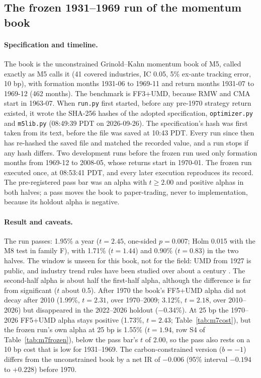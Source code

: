 \subsection{The frozen 1931--1969 run of the momentum book}
\label{app:m7frozen}
\paragraph{Specification and timeline.} The book is the unconstrained Grinold--Kahn momentum book of M5, called exactly as M5 calls it (41 covered industries, IC 0.05, 5\% ex-ante tracking error, 10 bp), with formation months 1931-06 to 1969-11 and return months 1931-07 to 1969-12 (462 months). The benchmark is FF3+UMD, because RMW and CMA start in 1963-07. When \texttt{run.py} first started, before any pre-1970 strategy return existed, it wrote the SHA-256 hashes of the adopted specification, \texttt{optimizer.py} and \texttt{m5lib.py} (08:49:39 PDT on 2026-09-26). The specification's hash was first taken from its text, before the file was saved at 10:43 PDT. Every run since then has re-hashed the saved file and matched the recorded value, and a run stops if any hash differs. Two development runs before the frozen run used only formation months from 1969-12 to 2008-05, whose returns start in 1970-01. The frozen run executed once, at 08:53:41 PDT, and every later execution reproduces its record. The pre-registered pass bar was an alpha with $t\ge2.00$ and positive alphas in both halves; a pass moves the book to paper-trading, never to implementation, because its holdout alpha is negative.

\paragraph{Result and caveats.} The run passes: 1.95\% a year ($t=2.45$, one-sided $p=0.007$; Holm 0.015 with the M8 test in family F), with 1.71\% ($t=1.44$) and 0.90\% ($t=0.83$) in the two halves. The window is unseen for this book, not for the field: UMD from 1927 is public, and industry trend rules have been studied over about a century \citep{za2024}. The second-half alpha is about half the first-half alpha, although the difference is far from significant ($t$ about 0.5). After 1970 the book's FF5+UMD alpha did not decay after 2010 (1.99\%, $t=2.31$, over 1970--2009; 3.12\%, $t=2.18$, over 2010--2026) but disappeared in the 2022--2026 holdout ($-0.34$\%). At 25 bp the 1970--2026 FF5+UMD alpha stays positive (1.73\%, $t=2.43$; Table~\ref{tab:m7cost}), but the frozen run's own alpha at 25 bp is 1.55\% ($t=1.94$, row S4 of Table~\ref{tab:m7frozen}), below the pass bar's $t$ of 2.00, so the pass also rests on a 10 bp cost that is low for 1931--1969. The carbon-constrained version ($b=-1$) differs from the unconstrained book by a net IR of $-0.006$ (95\% interval $-0.194$ to $+0.228$) before 1970.

